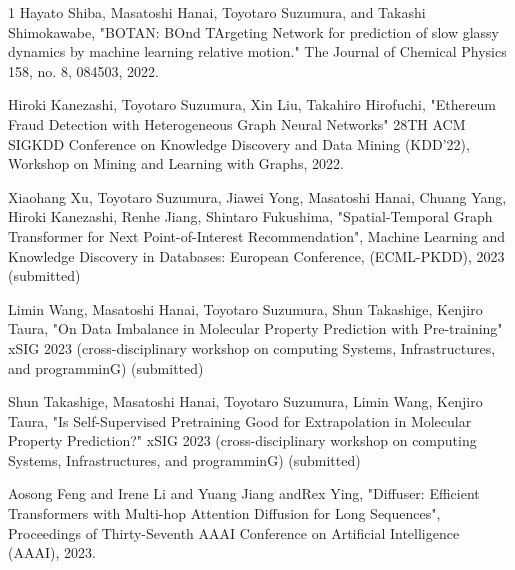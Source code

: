\begin{査読付}{1}
Hayato Shiba, Masatoshi Hanai, Toyotaro Suzumura, and Takashi Shimokawabe, "BOTAN: BOnd TArgeting Network for prediction of slow glassy dynamics by machine learning relative motion." The Journal of Chemical Physics 158, no. 8, 084503, 2022.

Hiroki Kanezashi, Toyotaro Suzumura, Xin Liu, Takahiro Hirofuchi,
"Ethereum Fraud Detection with Heterogeneous Graph Neural Networks"
28TH ACM SIGKDD Conference on Knowledge Discovery and Data Mining (KDD'22), Workshop on Mining and Learning with Graphs, 2022.

Xiaohang Xu, Toyotaro Suzumura, Jiawei Yong, Masatoshi Hanai, Chuang Yang, Hiroki Kanezashi, Renhe Jiang, Shintaro Fukushima, "Spatial-Temporal Graph Transformer for Next Point-of-Interest Recommendation", Machine Learning and Knowledge Discovery in Databases: European Conference, (ECML-PKDD), 2023 (submitted)


Limin Wang, Masatoshi Hanai, Toyotaro Suzumura, Shun Takashige, Kenjiro Taura, "On Data Imbalance in Molecular Property Prediction with Pre-training" xSIG 2023 (cross-disciplinary workshop on computing Systems, Infrastructures, and programminG)  (submitted)

Shun Takashige, Masatoshi Hanai, Toyotaro Suzumura, Limin Wang, Kenjiro Taura, "Is Self-Supervised Pretraining Good for Extrapolation in Molecular Property Prediction?" xSIG 2023 (cross-disciplinary workshop on computing Systems, Infrastructures, and programminG) (submitted)




Aosong Feng and Irene Li and Yuang Jiang andRex  Ying, "Diffuser: Efficient Transformers with Multi-hop Attention Diffusion for Long Sequences", Proceedings of Thirty-Seventh AAAI Conference on Artificial Intelligence (AAAI), 2023.

\end{査読付}

